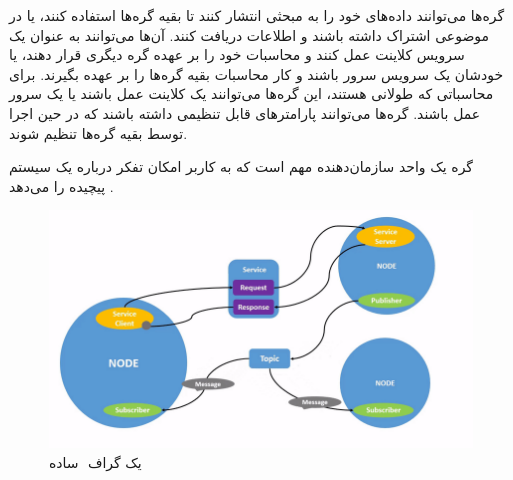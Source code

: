 گره‌ها می‌توانند داده‌های خود را به مبحثی انتشار کنند تا بقیه گره‌ها استفاده کنند، یا در موضوعی اشتراک داشته باشند و اطلاعات دریافت کنند. آن‌ها می‌توانند به عنوان یک سرویس‌ کلاینت عمل کنند و محاسبات خود را بر عهده گره دیگری قرار دهند، یا خودشان یک سرویس سرور باشند و کار محاسبات بقیه گره‌ها را بر عهده بگیرند. برای محاسباتی که طولانی هستند، این گره‌ها می‌توانند یک کلاینت عمل باشند یا یک سرور عمل‌ باشند. گره‌ها می‌توانند پارامتر‌های قابل تنظیمی داشته باشند که در حین اجرا توسط بقیه گره‌ها تنظیم شوند.
\begin{definition}
گره یک واحد سازمان‌دهنده مهم است که به کاربر امکان تفکر درباره یک سیستم پیچیده را می‌دهد \cite{doi:10.1126/scirobotics.abm6074}.
\end{definition}

\begin{figure}[h!]
    \centering
    \includegraphics[width=0.75\linewidth]{figures/ROS2_Node_Graph.png}
    \caption{یک گراف ‌ ساده \cite{ROS2:Humble_Documentation}}
    \label{fig:ROS2_Node_Graph}
\end{figure}

